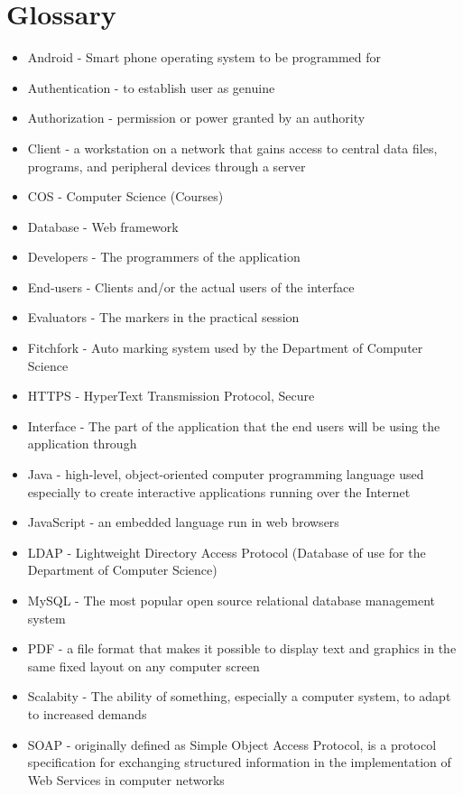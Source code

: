 \section{Glossary}
\begin{itemize}

\item Android - Smart phone operating system to be programmed for
\item Authentication - to establish user as genuine
\item Authorization - permission or power granted by an authority
\item Client - a workstation on a network that gains access to central data files, programs, and peripheral devices through a server
\item COS - Computer Science (Courses)
\item Database - Web framework
\item Developers - The programmers of the application
\item End-users - Clients and/or the actual users of the interface
\item Evaluators - The markers in the practical session
\item Fitchfork - Auto marking system used by the Department of Computer Science
\item HTTPS - HyperText Transmission Protocol, Secure 
\item Interface - The part of the application that the end users will be using the application through
\item Java -  high-level, object-oriented computer programming language used especially to create interactive applications running over the Internet
\item JavaScript - an embedded language run in web browsers
\item LDAP - Lightweight Directory Access Protocol (Database of use for the Department of Computer Science)
\item MySQL - The most popular open source relational database management system
\item PDF - a file format that makes it possible to display text and graphics in the same fixed layout on any computer screen
\item Scalabity - The ability of something, especially a computer system, to adapt to increased demands
\item SOAP - originally defined as Simple Object Access Protocol, is a protocol specification for exchanging structured information in the implementation of Web Services in computer networks


\end{itemize}
